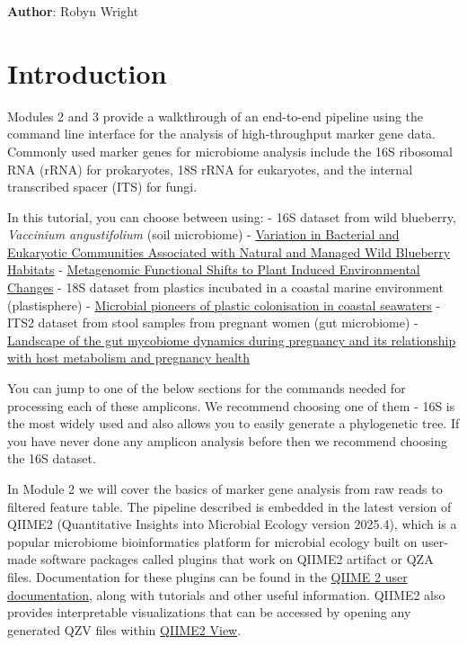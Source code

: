 \documentclass[
]{book}
\begin{document}
\textbf{Author}: Robyn Wright

\section{Introduction}\label{introduction-1}

Modules 2 and 3 provide a walkthrough of an end-to-end pipeline using the command line interface for the analysis of high-throughput marker gene data. Commonly used marker genes for microbiome analysis include the 16S ribosomal RNA (rRNA) for prokaryotes, 18S rRNA for eukaryotes, and the internal transcribed spacer (ITS) for fungi.

In this tutorial, you can choose between using:
- 16S dataset from wild blueberry, \emph{Vaccinium angustifolium} (soil microbiome)
- \href{https://apsjournals.apsnet.org/doi/10.1094/PBIOMES-03-17-0012-R}{Variation in Bacterial and Eukaryotic Communities Associated with Natural and Managed Wild Blueberry Habitats}
- \href{https://www.frontiersin.org/articles/10.3389/fmicb.2019.01682/full\#B50}{Metagenomic Functional Shifts to Plant Induced Environmental Changes}
- 18S dataset from plastics incubated in a coastal marine environment (plastisphere)
- \href{https://www.sciencedirect.com/science/article/pii/S0025326X22003836\#s0050}{Microbial pioneers of plastic colonisation in coastal seawaters}
- ITS2 dataset from stool samples from pregnant women (gut microbiome)
- \href{https://gut.bmj.com/content/73/8/1302.long}{Landscape of the gut mycobiome dynamics during pregnancy and its relationship with host metabolism and pregnancy health}

You can jump to one of the below sections for the commands needed for processing each of these amplicons. We recommend choosing one of them - 16S is the most widely used and also allows you to easily generate a phylogenetic tree. If you have never done any amplicon analysis before then we recommend choosing the 16S dataset.

In Module 2 we will cover the basics of marker gene analysis from raw reads to filtered feature table. The pipeline described is embedded in the latest version of QIIME2 (Quantitative Insights into Microbial Ecology version 2025.4), which is a popular microbiome bioinformatics platform for microbial ecology built on user-made software packages called plugins that work on QIIME2 artifact or QZA files. Documentation for these plugins can be found in the \href{https://qiime2.org/}{QIIME 2 user documentation}, along with tutorials and other useful information. QIIME2 also provides interpretable visualizations that can be accessed by opening any generated QZV files within \href{https://view.qiime2.org/}{QIIME2 View}.
\end{document}
